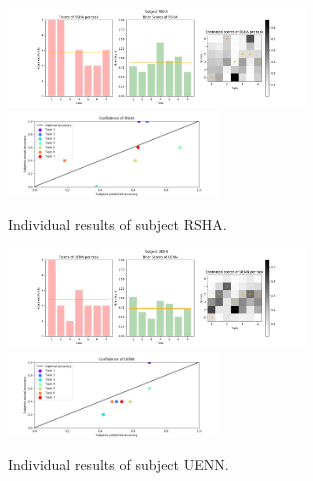 \documentclass[../main/main.tex]{subfiles}
\begin{document}
	\begin{figure}[H]
		\centering
		\captionsetup{justification=centering}
		\includegraphics[width=0.7\textwidth]{../assets/RSHA_results.png}
		\includegraphics[width=0.5\textwidth]{../assets/RSHA_confidence.png}
		\caption{Individual results of subject RSHA.} 
		\label{fig:RSHA}
	\end{figure}
	\begin{figure}[H]
		\centering
		\captionsetup{justification=centering}
		\includegraphics[width=0.7\textwidth]{../assets/UENN_results.png}
		\includegraphics[width=0.5\textwidth]{../assets/UENN_confidence.png}
		\caption{Individual results of subject UENN.} 		\label{fig:UENN}
	\end{figure}
\end{document}
